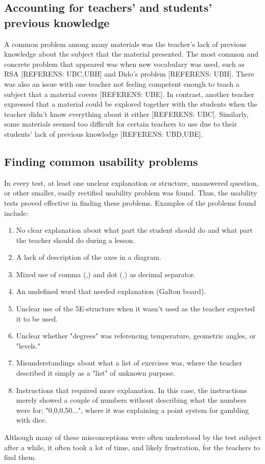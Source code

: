 \subsection{Accounting for teachers' and students' previous knowledge}
A common problem among many materials was the teacher's lack of previous knowledge about the subject that the material presented. The most common and concrete problem that appeared was when new vocabulary was used, such as RSA [REFERENS: UBC,UBH] and Dido's problem [REFERENS: UBH]. There was also an issue with one teacher not feeling competent enough to teach a subject that a material covers [REFERENS: UBE]. In contrast, another teacher expressed that a material could be explored together with the students when the teacher didn't know everything about it either [REFERENS: UBC]. Similarly, some materials seemed too difficult for certain teachers to use due to their students' lack of previous knowledge [REFERENS: UBD,UBE].

\subsection{Finding common usability problems}
In every test, at least one unclear explanation or structure, unanswered question, or other smaller, easily rectified usability problem was found. Thus, the usability tests proved effective in finding these problems. Examples of the problems found include:
\begin{enumerate}
	\item No clear explanation about what part the student should do and what part the teacher should do during a lesson.
	\item A lack of description of the axes in a diagram.
	\item Mixed use of comma (,) and dot (.) as decimal separator.
	\item An undefined word that needed explanation (Galton board).
	\item Unclear use of the 5E-structure when it wasn't used as the teacher expected it to be used.
	\item Unclear whether "degrees" was referencing temperature, geometric angles, or "levels."
	\item Misunderstandings about what a list of exercises was, where the teacher described it simply as a "list" of unknown purpose.
	\item Instructions that required more explanation. In this case, the instructions merely showed a couple of numbers without describing what the numbers were for; "0,0,0,50...", where it was explaining a point system for gambling with dice.
\end{enumerate}

Although many of these misconceptions were often understood by the test subject after a while, it often took a lot of time, and likely frustration, for the teachers to find them.
